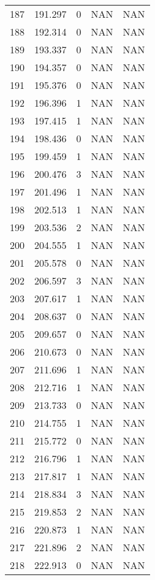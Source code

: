 \documentclass{article}
\begin{document}
\begin{longtable}{@{}lllll@{}}
				187 & 191.297 & 0    & NAN  & NAN  \\
				188 & 192.314 & 0    & NAN  & NAN  \\
				189 & 193.337 & 0    & NAN  & NAN  \\
				190 & 194.357 & 0    & NAN  & NAN  \\
				191 & 195.376 & 0    & NAN  & NAN  \\
				192 & 196.396 & 1    & NAN  & NAN  \\
				193 & 197.415 & 1    & NAN  & NAN  \\
				194 & 198.436 & 0    & NAN  & NAN  \\
				195 & 199.459 & 1    & NAN  & NAN  \\
				196 & 200.476 & 3    & NAN  & NAN  \\
				197 & 201.496 & 1    & NAN  & NAN  \\
				198 & 202.513 & 1    & NAN  & NAN  \\
				199 & 203.536 & 2    & NAN  & NAN  \\
				200 & 204.555 & 1    & NAN  & NAN  \\
				201 & 205.578 & 0    & NAN  & NAN  \\
				202 & 206.597 & 3    & NAN  & NAN  \\
				203 & 207.617 & 1    & NAN  & NAN  \\
				204 & 208.637 & 0    & NAN  & NAN  \\
				205 & 209.657 & 0    & NAN  & NAN  \\
				206 & 210.673 & 0    & NAN  & NAN  \\
				207 & 211.696 & 1    & NAN  & NAN  \\
				208 & 212.716 & 1    & NAN  & NAN  \\
				209 & 213.733 & 0    & NAN  & NAN  \\
				210 & 214.755 & 1    & NAN  & NAN  \\
				211 & 215.772 & 0    & NAN  & NAN  \\
				212 & 216.796 & 1    & NAN  & NAN  \\
				213 & 217.817 & 1    & NAN  & NAN  \\
				214 & 218.834 & 3    & NAN  & NAN  \\
				215 & 219.853 & 2    & NAN  & NAN  \\
				216 & 220.873 & 1    & NAN  & NAN  \\
				217 & 221.896 & 2    & NAN  & NAN  \\
				218 & 222.913 & 0    & NAN  & NAN  \\

\end{longtable}
\end{document}
